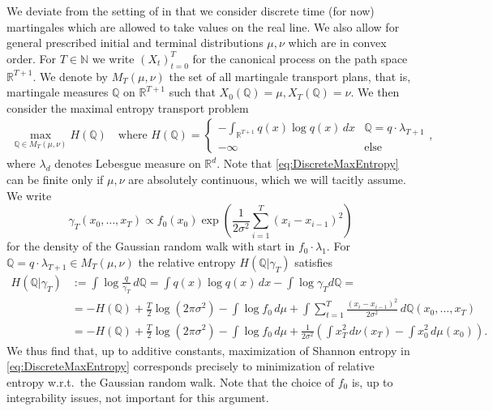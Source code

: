 \documentclass[reqno, a4paper]{amsart}
\theoremstyle{remark}
\newcommand{\Q}{\mathbb{Q}}
\newcommand{\R}{\mathbb{R}}
\newcommand{\NN}{{\mathbb N}}
\newcommand{\1}{\mathbbm 1}
\numberwithin{equation}{section}
\numberwithin{theorem}{section}
\begin{document}
We  deviate from the  setting of \cite{Al22a, Al22b} in that we  consider discrete time (for now)  martingales which are allowed to  take values on the real line. We also allow for general  prescribed initial and terminal distributions $\mu, \nu$  which are in convex order.
For $T\in \NN$ we  write $(X_t)_{t=0}^T$ for the canonical process on the path space $\R^{T+1}$. We denote by  $M_T(\mu, \nu) $  the set of all martingale transport plans, that is, martingale measures $\Q$ on $\R^{T+1}$ such that $X_0(\Q)= \mu, X_T(\Q)=\nu$. We then consider the maximal entropy transport problem 
\begin{align}\label{eq:DiscreteMaxEntropy}
\max_{\Q\in M_T(\mu, \nu)} H(\Q) \quad
\text{where } H(\Q) = \begin{cases} - \int_{\R^{T+1}} q(x) \log q(x)\, dx   & \Q= q \cdot \lambda_{T+1} \\
-\infty & \text{else} \end{cases},
\end{align} 
where $\lambda_d$ denotes Lebesgue measure on $\R^d$.
Note that \eqref{eq:DiscreteMaxEntropy} can be finite only if $\mu, \nu$ are absolutely continuous, which we will  tacitly assume. 
We write $$\gamma_{T}(x_0, \ldots, x_T) \propto  f_0 (x_0)  \exp{\left(\frac1{2\sigma^2}\sum_{i=1}^T (x_i-x_{i-1})^2 \right)} %
$$
for the density of the Gaussian random walk with start in $f_0 \cdot \lambda_1$. 
For $\Q= q \cdot \lambda_{T+1}\in M_T(\mu, \nu)$ the relative entropy $H(\Q|\gamma_T) $ satisfies
\begin{align*}
H(\Q|\gamma_T) & := \int \log \frac q{\gamma_T} \,  d \Q
= \int q(x) \log q(x)\, dx  -  \int \log \gamma_T  d\Q=  
\\
& =  - H(\Q)  +\frac  T 2 \log (2\pi \sigma^2 ) - \int \log f_0 \, d\mu + \int \sum_{t=1}^T\frac{(x_i-x_{i-1})^2} {2 \sigma^2} \, d \Q(x_0, \ldots, x_T) \\ 
&=      - H(\Q)  + \frac  T 2 \log (2\pi \sigma^2 )  - \int \log f_0 \, d\mu + \frac1{2\sigma^2}  \left( \int x_T^2 \, d\nu(x_T) - \int x_0^2 \,  d\mu(x_0)  \right) .
\end{align*}
We thus find that, up to additive constants, maximization of Shannon entropy in \eqref{eq:DiscreteMaxEntropy} corresponds precisely to minimization of relative entropy w.r.t.\ the Gaussian random walk. Note that the choice of $f_0$ is, up to integrability issues, not important for this argument.


\end{document}
